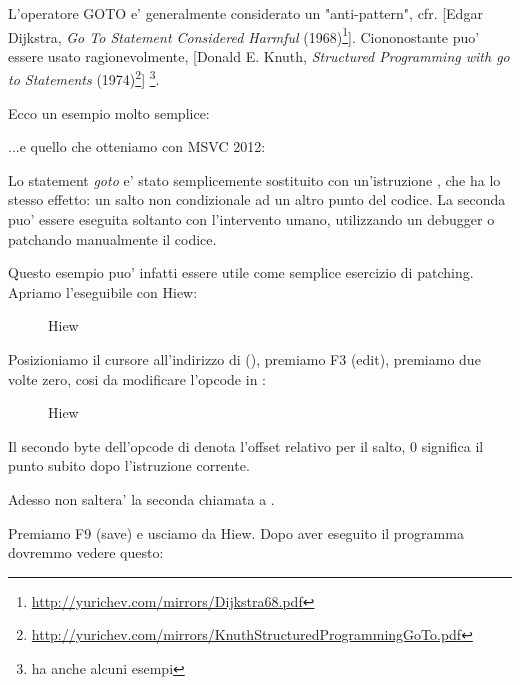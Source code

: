 
L'operatore GOTO e' generalmente considerato un "anti-pattern", cfr. [Edgar Dijkstra, \emph{Go To Statement Considered Harmful} (1968)\footnote{\url{http://yurichev.com/mirrors/Dijkstra68.pdf}}].
Ciononostante puo' essere usato ragionevolmente, [Donald E. Knuth, \emph{Structured Programming with go to Statements} (1974)\footnote{\url{http://yurichev.com/mirrors/KnuthStructuredProgrammingGoTo.pdf}}]
\footnote{\InSqBrackets{\CNotes} ha anche alcuni esempi}.

Ecco un esempio molto semplice:



...e quello che otteniamo con MSVC 2012:



Lo statement \emph{goto} e' stato semplicemente sostituito con un'istruzione \JMP, che ha lo stesso effetto: un salto non condizionale
ad un altro punto del codice.
La seconda \printf puo' essere eseguita soltanto con l'intervento umano, utilizzando un debugger o patchando manualmente il codice.

\par

\clearpage

Questo esempio puo' infatti essere utile come semplice esercizio di patching. Apriamo l'eseguibile con Hiew:

\begin{figure}[H]
\centering
{}
\caption{Hiew}
\label{fig:goto_hiew1}
\end{figure}

\clearpage
Posizioniamo il cursore all'indirizzo di \JMP (), 
premiamo F3 (edit), premiamo due volte zero, cosi da modificare l'opcode in :

\begin{figure}[H]
\centering
{}
\caption{Hiew}
\label{fig:goto_hiew2}
\end{figure}

Il secondo byte dell'opcode di \JMP denota l'offset relativo per il salto, 0 significa il punto subito dopo l'istruzione corrente.

Adesso \JMP non saltera' la seconda chiamata a \printf.

Premiamo F9 (save) e usciamo da Hiew. Dopo aver eseguito il programma dovremmo vedere questo:

